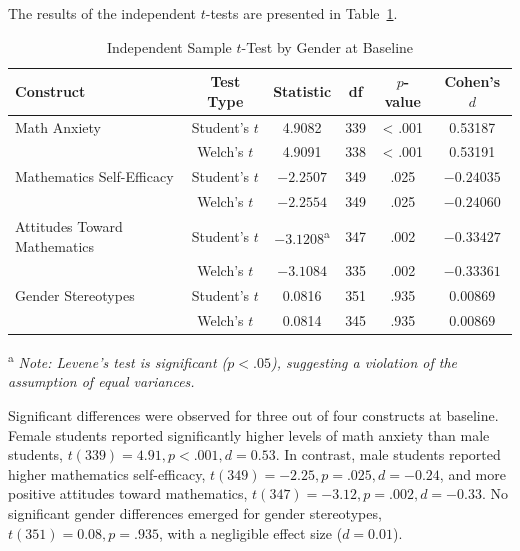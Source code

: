 The results of the independent  $t$-tests are presented in Table~\ref{tab:ttest_baseline}.
\begin{table}[htbp]
\centering
\caption{Independent Sample $t$-Test by Gender at Baseline}
\label{tab:ttest_baseline}
\vspace{0.3cm}
\renewcommand{\arraystretch}{1.2}

\begin{tabular}{lccccc}
\toprule
Construct & Test Type & Statistic & df & $p$-value & Cohen's $d$ \\
\midrule

Math Anxiety & Student's $t$ & 4.9082 & 339 & < .001 & 0.53187 \\
              & Welch's $t$  & 4.9091 & 338 & < .001 & 0.53191 \\

\addlinespace

Mathematics Self-Efficacy & Student's $t$ & $-2.2507$ & 349 & .025 & $-0.24035$ \\
                          & Welch's $t$  & $-2.2554$ & 349 & .025 & $-0.24060$ \\

\addlinespace

Attitudes Toward Mathematics & Student's $t$ & $-3.1208$\textsuperscript{a} & 347 & .002 & $-0.33427$ \\
                             & Welch's $t$  & $-3.1084$ & 335 & .002 & $-0.33361$ \\

\addlinespace

Gender Stereotypes & Student's $t$ & 0.0816 & 351 & .935 & 0.00869 \\
                    & Welch's $t$  & 0.0814 & 345 & .935 & 0.00869 \\

\bottomrule
\end{tabular}
\end{table}

\textsuperscript{a} \textit{Note: Levene's test is significant ($p < .05$), suggesting a violation of the assumption of equal variances.} 

Significant differences were observed for three out of four constructs at baseline. Female students reported significantly higher levels of math anxiety than male students, $t(339) = 4.91, p < .001, d = 0.53$. In contrast, male students reported higher mathematics self-efficacy, $t(349) = -2.25, p = .025, d = -0.24$, and more positive attitudes toward mathematics, $t(347) = -3.12, p = .002, d = -0.33$. No significant gender differences emerged for gender stereotypes, $t(351) = 0.08, p = .935$, with a negligible effect size ($d = 0.01$).




